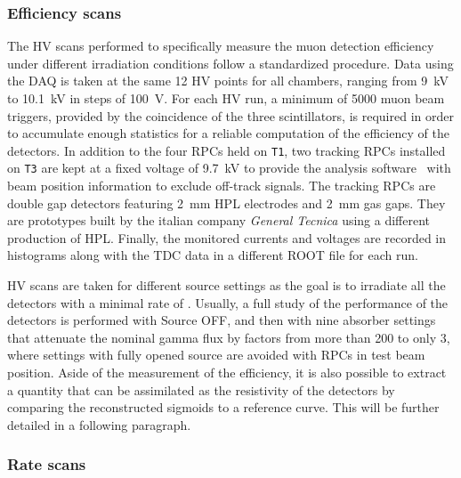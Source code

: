 		\subsubsection{Efficiency scans}
		\label{chapt5:sssec:effscan}
	
	The HV scans performed to specifically measure the muon detection efficiency under different irradiation conditions follow a standardized procedure. Data using the DAQ is taken at the same 12 HV points for all chambers, ranging from \SI{9}{kV} to \SI{10.1}{kV} in steps of \SI{100}{V}. For each HV run, a minimum of 5000 muon beam triggers, provided by the coincidence of the three scintillators, is required in order to accumulate enough statistics for a reliable computation of the efficiency of the detectors. In addition to the four RPCs held on \texttt{T1}, two tracking RPCs installed on \texttt{T3} are kept at a fixed voltage of \SI{9,7}{kV} to provide the analysis software~\cite{GIFOffline} with beam position information to exclude off-track signals. The tracking RPCs are double gap detectors featuring \SI{2}{mm} HPL electrodes and \SI{2}{mm} gas gaps. They are prototypes built by the italian company \textit{General Tecnica} using a different production of HPL. Finally, the monitored currents and voltages are recorded in histograms along with the TDC data in a different ROOT file for each run.
	
	HV scans are taken for different source settings as the goal is to irradiate all the detectors with a minimal rate of . Usually, a full study of the performance of the detectors is performed with Source OFF, and then with nine absorber settings that attenuate the nominal gamma flux by factors from more than 200 to only 3, where settings with fully opened source are avoided with RPCs in test beam position. Aside of the measurement of the efficiency, it is also possible to extract a quantity that can be assimilated as the resistivity of the detectors by comparing the reconstructed sigmoids to a reference curve. This will be further detailed in a following paragraph.
	
		\subsubsection{Rate scans}
		\label{chapt5:sssec:ratescan}
		
